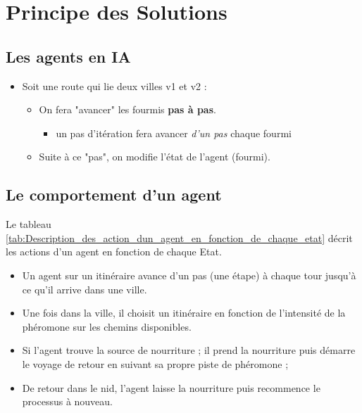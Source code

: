 \documentclass{rapportECL}
\begin{document}
\section{Principe des Solutions}




\subsection{Les agents en IA}

\begin{itemize}[label=$\bullet$]
    \item Soit une route qui lie deux villes v1 et v2 :
    \begin{itemize}
        \item On fera "avancer" les fourmis \textbf{pas à pas}.
        \begin{itemize}
            \item un pas d’itération fera avancer \textit{d’un pas} chaque fourmi
        \end{itemize}
        \item Suite à ce "pas", on modifie l’état de l’agent (fourmi).
    \end{itemize}
\end{itemize}

\subsection{Le comportement d’un agent}

Le tableau \ref{tab:Description_des_action_dun_agent_en_fonction_de_chaque_etat} décrit les actions d’un agent en fonction de chaque Etat.



\begin{itemize}[label=$\bullet$]
    \item Un agent sur un itinéraire avance d’un pas (une étape) à chaque tour jusqu’à ce qu’il arrive dans une ville.
    \item Une fois dans la ville, il choisit un itinéraire en fonction de l’intensité de la
phéromone sur les chemins disponibles.
    \item Si l’agent trouve la source de nourriture ; il prend la nourriture puis démarre le
voyage de retour en suivant sa propre piste de phéromone ;
    \item De retour dans le nid, l’agent laisse la nourriture puis recommence le processus
à nouveau.
\end{itemize}
\end{document}
